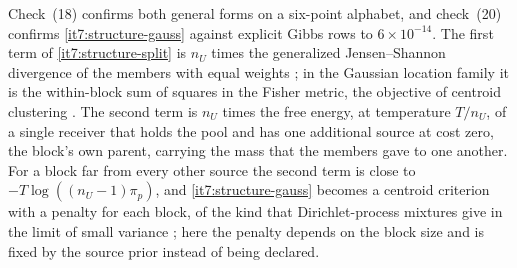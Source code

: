 \documentclass[11pt,letterpaper]{report}
\begin{document}
Check~(18) confirms both general forms on a six-point alphabet, and check~(20) confirms \cref{it7:structure-gauss} against explicit Gibbs rows to $6\times10^{-14}$. The first term of \cref{it7:structure-split} is $n_U$ times the generalized Jensen--Shannon divergence of the members with equal weights \citep{Lin1991}; in the Gaussian location family it is the within-block sum of squares in the Fisher metric, the objective of centroid clustering \citep{Lloyd1982}. The second term is $n_U$ times the free energy, at temperature $T/n_U$, of a single receiver that holds the pool and has one additional source at cost zero, the block's own parent, carrying the mass that the members gave to one another. For a block far from every other source the second term is close to $-T\log((n_U-1)\pi_p)$, and \cref{it7:structure-gauss} becomes a centroid criterion with a penalty for each block, of the kind that Dirichlet-process mixtures give in the limit of small variance \citep{KulisJordan2012}; here the penalty depends on the block size and is fixed by the source prior instead of being declared.
\end{document}
